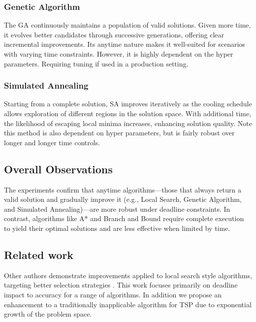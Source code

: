 \documentclass[11pt]{article}
\begin{document}
	\subsubsection{Genetic Algorithm} 
	The GA continuously maintains a population of valid solutions. Given more time, it evolves better candidates through successive generations, offering clear incremental improvements. Its anytime nature makes it well-suited for scenarios with varying time constraints. However, it is highly dependent on the hyper parameters. Requiring tuning if used in a production setting.
	
	\subsubsection{Simulated Annealing} 
	Starting from a complete solution, SA improves iteratively as the cooling schedule allows exploration of different regions in the solution space. With additional time, the likelihood of escaping local minima increases, enhancing solution quality. Note this method is also dependent on hyper parameters, but is fairly robust over longer and longer time controls.
	
	\subsection{Overall Observations}
	The experiments confirm that anytime algorithms—those that always return a valid solution and gradually improve it (e.g., Local Search, Genetic Algorithm, and Simulated Annealing)—are more robust under deadline constraints. In contrast, algorithms like A* and Branch and Bound require complete execution to yield their optimal solutions and are less effective when limited by time.
	
	\subsection{Related work}
	Other authors demonstrate improvements applied to local search style algorithms, targeting better selection strategies \cite{8367362}\cite{6492788}. This work focuses primarily on deadline impact to accuracy for a range of algorithms. In addition we propose an enhancement to a traditionally inapplicable algorithm for TSP due to exponential growth of the problem space.
	
\end{document}
